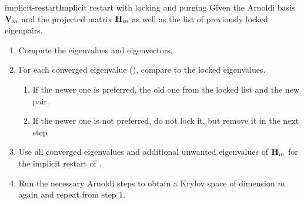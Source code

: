 

\begin{Algorithm*}{implicit-restart}{Implicit restart with locking and purging}
  Given the Arnoldi basis $\mathbf V_m$ and the projected matrix $\mathbf H_m$
  as well as the list of previously locked eigenpairs.
  \begin{enumerate}
  \item Compute the eigenvalues and eigenvectors.
  \item For each converged eigenvalue (), compare to the locked eigenvalues.
  \begin{enumerate}
  \item If the newer one is preferred,  the old one from the locked list and  the new pair.
  \item If the newer one is not preferred, do not lock it, but remove
    it in the next step
  \end{enumerate}
\item Use all converged eigenvalues and additional unwanted
  eigenvalues of $\mathbf H_m$ for the implicit restart of
  .
\item Run the necessary Arnoldi steps to obtain a Krylov space of
  dimension $m$ again and repeat from step 1.
  \end{enumerate}
\end{Algorithm*}

